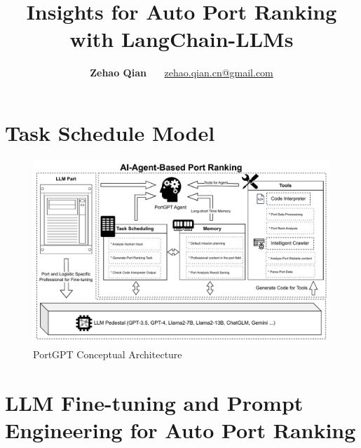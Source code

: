 \documentclass[11pt]{article} %
\title{Insights for Auto Port Ranking with LangChain-LLMs}
\author{\textbf{Zehao Qian} \ \ \ \href{mailto:zehao.qian.cn@gmail.com}{zehao.qian.cn@gmail.com}}
\begin{document}
\maketitle
% 
% 
% 
% 
% 
% 
% 
\section{Task Schedule Model}
% 
\begin{figure}[H]
    \centering
    \includegraphics[width=1.0\textwidth]{pic/PortGPT.pdf}
    \caption{PortGPT Conceptual Architecture}
    \label{fig:PortGPT}
\end{figure}
%
% 
% 
% 
% 
% 
\section{LLM Fine-tuning and Prompt Engineering for Auto Port Ranking}
% 
% 
% 
% 
% 
\end{document}
